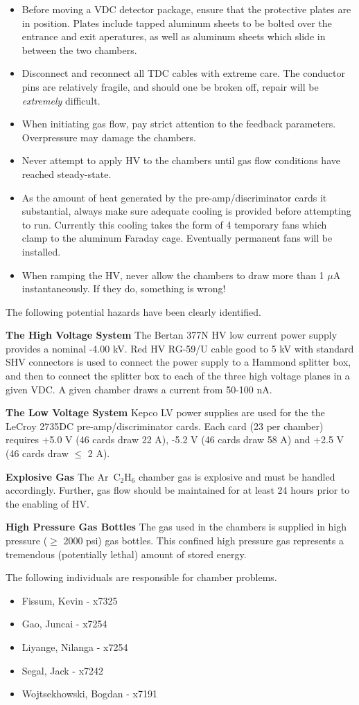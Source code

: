\begin{itemize}
\item{Before moving a VDC detector package, ensure that the protective
plates are in position.  Plates include tapped aluminum sheets to
be bolted over the entrance and exit aperatures, as well as aluminum
sheets which slide in between the two chambers.}
\item{Disconnect and reconnect all TDC cables with extreme care.  The
conductor pins are relatively fragile, and should one be broken off,
repair will be {\it extremely} difficult.}
\item{When initiating gas flow, pay strict attention to the feedback
parameters.  Overpressure may damage the chambers.}
\item{Never attempt to apply HV to the chambers until gas flow
conditions have reached steady-state.}
\item{As the amount of heat generated by the pre-amp/discriminator
cards it substantial, always make sure adequate cooling is provided
before attempting to run.  Currently this cooling takes the form of
4 temporary fans which clamp to the aluminum Faraday cage.  Eventually
permanent fans will be installed.}
\item{When ramping the HV, never allow the chambers to draw more than
1 $\mu$A instantaneously.  If they do, something is wrong!}
\end{itemize}

The following potential hazards have been clearly identified.
\begin{description}
\item {\bf The High Voltage System}
The Bertan 377N HV low current power supply provides a nominal
-4.00 kV.  Red HV RG-59/U cable good to 5 kV with standard SHV
connectors is used to connect the power supply to a Hammond splitter
box, and then to connect the splitter box to each of the three high
voltage planes in a given VDC.  A given chamber draws a current
from  50-100 nA.
\item {\bf The Low Voltage System}
Kepco LV power supplies are used for the the LeCroy 2735DC
pre-amp/discriminator cards.  Each card (23 per chamber) requires
+5.0 V (46 cards draw 22 A), -5.2 V (46 cards draw 58 A) and +2.5 V
(46 cards draw $\leq$ 2 A).
\item{\bf Explosive Gas} The Ar~C$_2$H$_6$ chamber gas is explosive
and must be handled accordingly.  Further, gas flow should be maintained
for at least 24 hours prior to the enabling of HV.
\item{\bf High Pressure Gas Bottles} The gas used in the chambers
is supplied in high pressure ($\ge$ 2000 psi) gas bottles. This
confined high pressure gas represents a tremendous (potentially lethal)
amount of stored energy.
\end{description}

The following individuals are responsible for chamber problems. 
\begin{itemize} 
\item[~]Fissum, Kevin - x7325 
\item[~]Gao, Juncai - x7254 
\item[~]Liyange, Nilanga - x7254 
\item[~]Segal, Jack - x7242 
\item[~]Wojtsekhowski, Bogdan - x7191 
\end{itemize} 
